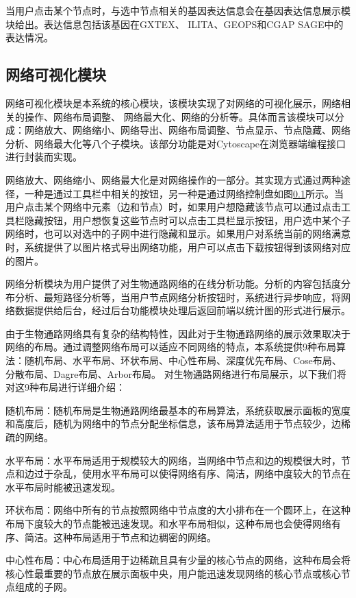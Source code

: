 当用户点击某个节点时，与选中节点相关的基因表达信息会在基因表达信息展示模块给出。表达信息包括该基因在GXTEX\cite{}、 ILITA\cite{}、GEOPS\cite{}和CGAP SAGE\cite{}中的表达情况。

\subsection{网络可视化模块}
网络可视化模块是本系统的核心模块，该模块实现了对网络的可视化展示，网络相关的操作、网络布局调整、 网络最大化、网络的分析等。具体而言该模块可以分成：网络放大、网络缩小、网络导出、网络布局调整、节点显示、节点隐藏、网络分析、网络最大化等八个子模块。该部分功能是对Cytoscape在浏览器端编程接口进行封装而实现。 

网络放大、网络缩小、网络最大化是对网络操作的一部分。其实现方式通过两种途径，一种是通过工具栏中相关的按钮，另一种是通过网络控制盘如图\ref{}所示。当用户点击某个网络中元素（边和节点）时，如果用户想隐藏该节点可以通过点击工具栏隐藏按钮，用户想恢复这些节点时可以点击工具栏显示按钮，用户选中某个子网络时，也可以对选中的子网中进行隐藏和显示。如果用户对系统当前的网络满意时，系统提供了以图片格式导出网络功能，用户可以点击下载按钮得到该网络对应的图片。

网络分析模块为用户提供了对生物通路网络的在线分析功能。分析的内容包括度分布分析、最短路径分析等，当用户节点网络分析按钮时，系统进行异步响应，将网络数据提供给后台，经过后台功能模块处理后返回前端以统计图的形式进行展示。

由于生物通路网络具有复杂的结构特性，因此对于生物通路网络的展示效果取决于网络的布局。通过调整网络布局可以适应不同网络的特点，本系统提供9种布局算法：随机布局、水平布局、环状布局、中心性布局、深度优先布局、Cose布局、分散布局、Dagre布局、Arbor布局。 对生物通路网络进行布局展示，以下我们将对这9种布局进行详细介绍：

随机布局：随机布局是生物通路网络最基本的布局算法，系统获取展示面板的宽度和高度后，随机为网络中的节点分配坐标信息，该布局算法适用于节点较少，边稀疏的网络。

水平布局：水平布局适用于规模较大的网络，当网络中节点和边的规模很大时，节点和边过于杂乱，使用水平布局可以使得网络有序、简洁，网络中度较大的节点在水平布局时能被迅速发现。

环状布局：网络中所有的节点按照网络中节点度的大小排布在一个圆环上，在这种布局下度较大的节点能被迅速发现。和水平布局相似，这种布局也会使得网络有序、简洁。这种布局适用于节点和边稠密的网络。

中心性布局：中心布局适用于边稀疏且具有少量的核心节点的网络，这种布局会将核心性最重要的节点放在展示面板中央，用户能迅速发现网络的核心节点或核心节点组成的子网。

